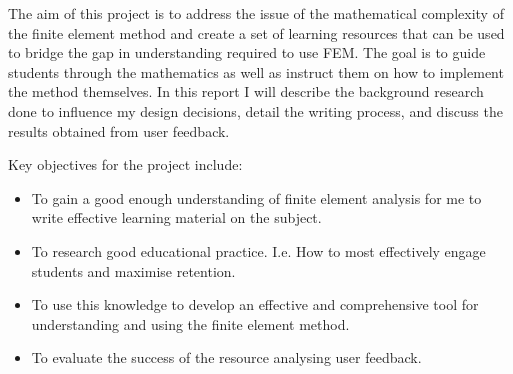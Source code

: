 
The aim of this project is to address the issue of the mathematical complexity of the finite element method and create a set of learning resources that can be used to bridge the gap in understanding required to use FEM. The goal is to guide students through the mathematics as well as instruct them on how to implement the method themselves. In this report I will describe the background research done to influence my design decisions, detail the writing process, and discuss the results obtained from user feedback.

Key objectives for the project include:

\begin{itemize}
    \item To gain a good enough understanding of finite element analysis for me to write effective learning material on the subject.

    \item To research good educational practice. I.e. How to most effectively engage students and maximise retention.

    \item To use this knowledge to develop an effective and comprehensive tool for understanding and using the finite element method.

    \item To evaluate the success of the resource analysing user feedback.
\end{itemize}
